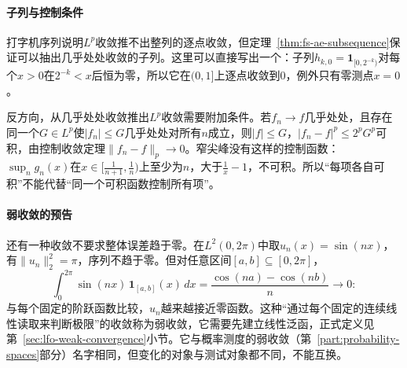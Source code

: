 \paragraph{子列与控制条件}
打字机序列说明$L^p$收敛推不出整列的逐点收敛，但定理~\ref{thm:fs-ae-subsequence}保证可以抽出几乎处处收敛的子列。这里可以直接写出一个：子列$h_{k,0}=\mathbf 1_{[0,2^{-k})}$对每个$x>0$在$2^{-k}<x$后恒为零，所以它在$(0,1]$上逐点收敛到$0$，例外只有零测点$x=0$。

反方向，从几乎处处收敛推出$L^p$收敛需要附加条件。若$f_n\to f$几乎处处，且存在同一个$G\in L^p$使$|f_n|\leq G$几乎处处对所有$n$成立，则$|f|\leq G$，$|f_n-f|^p\leq2^pG^p$可积，由控制收敛定理$\|f_n-f\|_p\to0$。窄尖峰没有这样的控制函数：$\sup_ng_n(x)$在$x\in[\tfrac1{n+1},\tfrac1n)$上至少为$n$，大于$\tfrac1x-1$，不可积。所以“每项各自可积”不能代替“同一个可积函数控制所有项”。

\paragraph{弱收敛的预告}
还有一种收敛不要求整体误差趋于零。在$L^2(0,2\pi)$中取$u_n(x)=\sin(nx)$，有$\|u_n\|_2^2=\pi$，序列不趋于零。但对任意区间$[a,b]\subseteq[0,2\pi]$，
\[
 \int_0^{2\pi}\sin(nx)\,\mathbf 1_{[a,b]}(x)\,dx=\frac{\cos(na)-\cos(nb)}{n}\to0 :
\]
与每个固定的阶跃函数比较，$u_n$越来越接近零函数。这种“通过每个固定的连续线性读取来判断极限”的收敛称为弱收敛，它需要先建立线性泛函，正式定义见第~\ref{sec:lfo-weak-convergence}小节。它与概率测度的弱收敛（第~\ref{part:probability-spaces}部分）名字相同，但变化的对象与测试对象都不同，不能互换。
